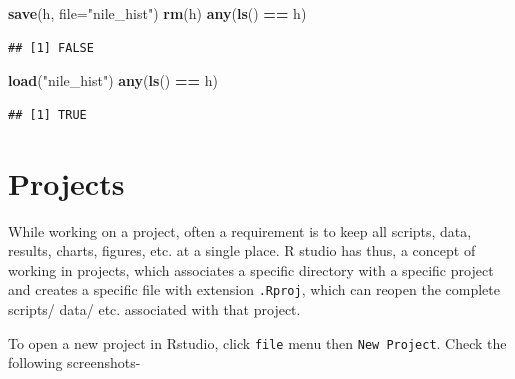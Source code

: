 \documentclass[
]{book}
\newenvironment{Shaded}{\begin{snugshade}}{\end{snugshade}}
\newcommand{\AttributeTok}[1]{\textcolor[rgb]{0.13,0.29,0.53}{#1}}
\newcommand{\FunctionTok}[1]{\textcolor[rgb]{0.13,0.29,0.53}{\textbf{#1}}}
\newcommand{\NormalTok}[1]{#1}
\newcommand{\SpecialCharTok}[1]{\textcolor[rgb]{0.81,0.36,0.00}{\textbf{#1}}}
\newcommand{\StringTok}[1]{\textcolor[rgb]{0.31,0.60,0.02}{#1}}
\begin{document}
\begin{Shaded}
\begin{Highlighting}[]
\FunctionTok{save}\NormalTok{(h, }\AttributeTok{file=}\StringTok{"nile\_hist"}\NormalTok{)}
\FunctionTok{rm}\NormalTok{(h)}
\FunctionTok{any}\NormalTok{(}\FunctionTok{ls}\NormalTok{() }\SpecialCharTok{==} \StringTok{\textquotesingle{}h\textquotesingle{}}\NormalTok{)}
\end{Highlighting}
\end{Shaded}

\begin{verbatim}
## [1] FALSE
\end{verbatim}

\begin{Shaded}
\begin{Highlighting}[]
\FunctionTok{load}\NormalTok{(}\StringTok{"nile\_hist"}\NormalTok{)}
\FunctionTok{any}\NormalTok{(}\FunctionTok{ls}\NormalTok{() }\SpecialCharTok{==} \StringTok{\textquotesingle{}h\textquotesingle{}}\NormalTok{)}
\end{Highlighting}
\end{Shaded}

\begin{verbatim}
## [1] TRUE
\end{verbatim}

\hypertarget{projects}{%
\section{Projects}\label{projects}}

While working on a project, often a requirement is to keep all scripts, data, results, charts, figures, etc. at a single place. R studio has thus, a concept of working in projects, which associates a specific directory with a specific project and creates a specific file with extension \texttt{.Rproj}, which can reopen the complete scripts/ data/ etc. associated with that project.

To open a new project in Rstudio, click \texttt{file} menu then \texttt{New\ Project}. Check the following screenshots-
\end{document}
